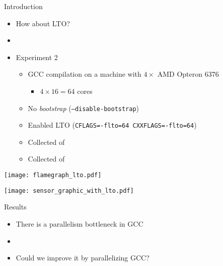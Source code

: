 \begin{frame}{Introduction}
    \begin{itemize}
        \item How about LTO?
        \item[]
        \item Experiment 2
        \begin{itemize}
            \item GCC compilation on a machine with $4\times$ AMD Opteron 6376
                \begin{itemize}
                    \item $4 \times 16 = 64$ cores
                \end{itemize}
            \item No \textit{bootstrap} (\texttt{--disable-bootstrap})
            \item Enabled LTO (\texttt{CFLAGS=-flto=64 CXXFLAGS=-flto=64})
            \item Collected {\color{blue}{Compilation Time}} of {\color{red}{each file}}
            \item Collected {\color{blue}{Consumed Energy}} of {\color{red}{all CPUs}}
        \end{itemize}
    \end{itemize}
\end{frame}

\begin{frame}
    \texttt{[image: flamegraph\_lto.pdf]}
    \label{fig:analysis_lto}
\end{frame}

\begin{frame}
    \centering
    \texttt{[image: sensor\_graphic\_with\_lto.pdf]}
    \label{fig:sensor_graphic_lto}
\end{frame}


\begin{frame}{Results}
    \begin{itemize}
        \item There is a parallelism bottleneck in GCC
        \item[]
        \item Could we improve it by parallelizing GCC?
    \end{itemize}
\end{frame}



